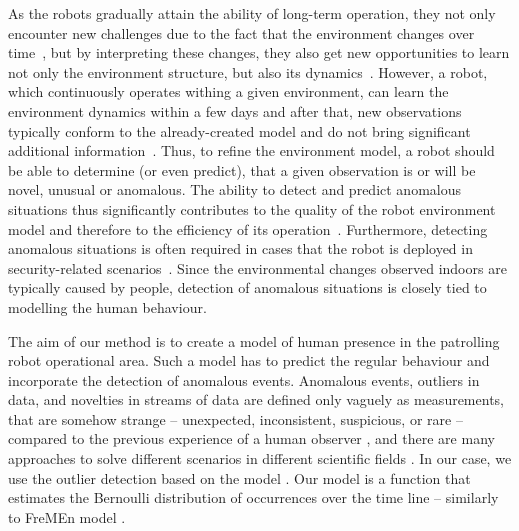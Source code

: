 As the robots gradually attain the ability of long-term operation, they not only encounter new challenges due to the fact that the environment changes over time~\cite{krajnik2016persistent,krajnik2014long}, but by interpreting these changes, they also get new opportunities to learn not only the environment structure, but also its dynamics~\cite{hawes2017strands,kunze2018artificial}. 
However, a robot, which continuously operates withing a given environment, can learn the environment dynamics within a few days and after that, new observations typically conform to the already-created model and do not bring significant additional information~\cite{krajnik2017fremen,coppola2016learning}. 
Thus, to refine the environment model, a robot should be able to determine (or even predict), that a given observation is or will be novel, unusual or anomalous.
The ability to detect and predict anomalous situations thus significantly contributes to the quality of the robot environment model and therefore to the efficiency of its operation~\cite{santos2017spatio,santos2016lifelong,hanheide2017and}. 
Furthermore, detecting anomalous situations is often required in cases that the robot is deployed in security-related scenarios~\cite{hawes2017strands}. 
Since the environmental changes observed indoors are typically caused by people, detection of anomalous situations is closely tied to modelling the human behaviour. 

The aim of our method is to create a model of human presence in the patrolling robot operational area.
Such a model has to predict the regular behaviour and incorporate the detection of anomalous events. 
Anomalous events, outliers in data, and novelties in streams of data are defined only vaguely as measurements, that are somehow strange -- unexpected, inconsistent, suspicious, or rare -- compared to the previous experience of a human observer \cite{grubbs1969procedures}, \cite{barnett1974outliers} and there are many approaches to solve different scenarios in different scientific fields \cite{ilango2012five}. 
In our case, we use the outlier detection based on the model \cite{rousseeuw2005robust}. 
Our model is a function that estimates the Bernoulli distribution \cite{evans20004} of occurrences over the time line -- similarly to FreMEn model \cite{krajnik2014spectral,krajnik2017fremen,coppola2016learning}.


